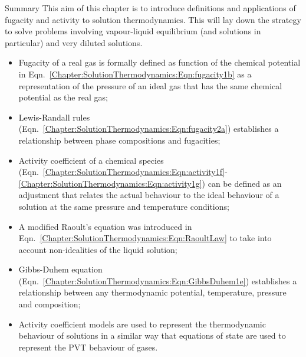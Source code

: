 \clearpage   
\begin{FinalSummaryBlock}{Summary}
     This aim of this chapter is to introduce definitions and applications of fugacity and activity to solution thermodynamics. This will lay down the strategy to solve problems involving vapour-liquid equilibrium (and solutions in particular) and very diluted solutions. 
    \begin{itemize}
       \item Fugacity of a real gas is formally defined as function of the chemical potential in Eqn.~\ref{Chapter:SolutionThermodynamics:Eqn:fugacity1b} as a representation of the pressure of an ideal gas that has the same chemical potential as the real gas;
       \item Lewis-Randall rules (Eqn.~\ref{Chapter:SolutionThermodynamics:Eqn:fugacity2a}) establishes a relationship between phase compositions and fugacities; 
       \item Activity coefficient of a chemical species (Eqn.~\ref{Chapter:SolutionThermodynamics:Eqn:activity1f}-\ref{Chapter:SolutionThermodynamics:Eqn:activity1g}) can be defined as an adjustment that relates the actual behaviour to the ideal behaviour of a solution at the same pressure and temperature conditions;
       \item A modified Raoult's equation was introduced in Eqn.~\ref{Chapter:SolutionThermodynamics:Eqn:RaoultLaw} to take into account non-idealities of the liquid solution;
       \item Gibbs-Duhem equation (Eqn.~\ref{Chapter:SolutionThermodynamics:Eqn:GibbsDuhem1e}) establishes a relationship between any thermodynamic potential, temperature, pressure and composition;
       \item Activity coefficient models are used to represent the thermodynamic behaviour of solutions in a similar way that equations of state are used to represent the PVT behaviour of gases.
    \end{itemize}
\end{FinalSummaryBlock}

